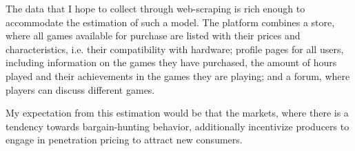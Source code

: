 \documentclass[13pt]{article}
\numberwithin{figure}{section}
\numberwithin{table}{section}
\theoremstyle{indented}
\numberwithin{equation}{section} %
\begin{document}
The data that I hope to collect through web-scraping is rich enough to accommodate the estimation of such a model. The platform combines a store, where all games available for purchase are listed with their prices and characteristics, i.e. their compatibility with hardware; profile pages for all users, including information on the games they have purchased, the amount of hours played and their achievements in the games they are playing; and a forum, where players can discuss different games. 

My expectation from this estimation would be that the markets, where  there is a tendency towards bargain-hunting behavior, additionally incentivize producers to engage in penetration pricing to attract new consumers. 

\newpage

\end{document}
